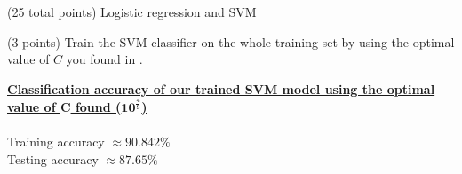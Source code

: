 \documentclass[12pt]{article}
\begin{document}
\begin{question}{(25 total points) Logistic regression and SVM}
\begin{subquestion}
   \end{subquestion}
   \begin{subquestion}{(3 points)
       Train the SVM classifier on the whole training set by using the
       optimal value of $C$ you found in . 
     } \label{Q2.6}


       

      \begin{answerbox}{8em}
        \textbf{\underline{Classification accuracy of our trained SVM model using the optimal}} \\
        \textbf{\underline{value of $\mathbf{C}$ found ($\mathbf{10^{\frac{4}{3}}}$)}}\\
        \\
        \footnotesize{
        Training accuracy $\approx 90.842\%$\\
        Testing accuracy $\approx 87.65\%$
        }
      \end{answerbox}
  


   \end{subquestion}
%
%

\end{question}
\clearpage
%
%
\end{document}
